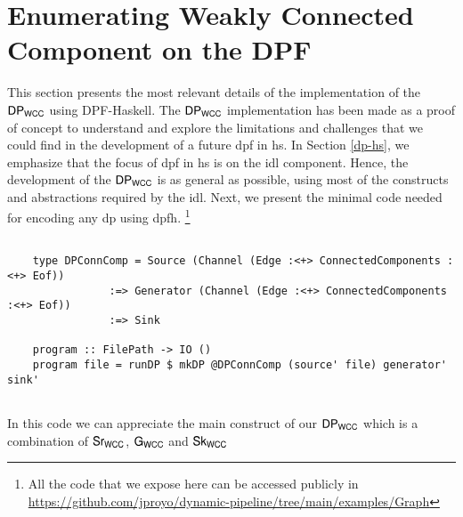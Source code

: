 \section{Enumerating Weakly Connected Component on the DPF}\label{sec:wcc-dpf}
This section presents the most relevant details of the implementation of the $\mathsf{DP_{WCC}}$ using DPF-Haskell. 
The $\mathsf{DP_{WCC}}$ implementation has been made as a proof of concept to understand and explore the limitations and challenges that we could find in the development of a future \acrshort{dpf} in \acrshort{hs}. 
In Section \ref{dp-hs}, we emphasize that the focus of \acrshort{dpf} in \acrshort{hs} is on the \acrshort{idl} component. 
Hence, the development of the $\mathsf{DP_{WCC}}$ is as general as possible, using most of the constructs and abstractions required by the \acrshort{idl}. 
Next, we present the minimal code needed for encoding any \acrshort{dp} using \acrshort{dpfh}. \footnote{All the code that we expose here can be accessed publicly in \url{https://github.com/jproyo/dynamic-pipeline/tree/main/examples/Graph}}

\begin{listing}[H]
  \begin{verbatim}
    
    type DPConnComp = Source (Channel (Edge :<+> ConnectedComponents :<+> Eof))
                :=> Generator (Channel (Edge :<+> ConnectedComponents :<+> Eof))
                :=> Sink

    program :: FilePath -> IO ()
    program file = runDP $ mkDP @DPConnComp (source' file) generator' sink'
        
  \end{verbatim}
  \caption[{[\texttt{ConnectedComp.hs}] Main entry point of the program}]{In this code we can appreciate the main construct of our $\dpwcc$ which is a combination of $\iwc$, $\gwc$ and $\owc$}
  \label{src:dpwcc:1}
\end{listing}

